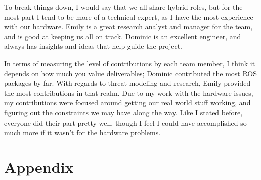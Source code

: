 \documentclass[IEEEtran,letterpaper,10pt,notitlepage,draftclsnofoot,onecolumn]{article}
\begin{document}
To break things down, I would say that we all share hybrid roles, but for the most part I tend to be more of a technical expert, as I have the most experience with our hardware. Emily is a great research analyst and manager for the team, and is good at keeping us all on track. Dominic is an excellent engineer, and always has insights and ideas that help guide the project.

In terms of measuring the level of contributions by each team member, I think it depends on how much you value deliverables; Dominic contributed the most ROS packages by far. With regards to threat modeling and research, Emily provided the most contributions in that realm. Due to my work with the hardware issues, my contributions were focused around getting our real world stuff working, and figuring out the constraints we may have along the way. Like I stated before, everyone did their part pretty well, though I feel I could have accomplished so much more if it wasn't for the hardware problems.

\section{Appendix}
\appendix
\end{document}
